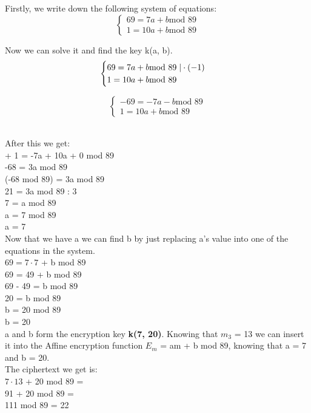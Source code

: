 \documentclass[12pt]{article}
\begin{document}
\noindent Firstly, we write down the following system of equations:
$$\begin{cases}
    69 = 7a + b \text{mod 89} \\
    1 = 10a + b \text{mod 89} 
\end{cases}$$

Now we can solve it and find the key k(a, b). 
$$\begin{cases}
    69 = 7a + b \text{mod 89} \hspace{0.1cm} | \cdot (-1) \\
    1 = 10a + b \text{mod 89} 
\end{cases}$$

$$\begin{cases}
    -69 = -7a - b \text{mod 89} \\
    1 = 10a + b \text{mod 89} 
\end{cases}$$

\noindent \\After this we get: \\

 + 1 = -7a + 10a + 0 mod 89 \\
-68 = 3a mod 89 \\
(-68 mod 89) = 3a mod 89 \\
21 = 3a mod 89 \textbar{} : 3\\
7 = a mod 89 \\
a = 7 mod 89 \\
a = 7 \\

\noindent Now that we have a we can find b by just replacing a's value into one of the equations in the system. \\

\noindent $69 = 7 \cdot 7$ + b mod 89 \\
69 = 49 + b mod 89 \\
69 - 49 = b mod 89 \\
20 = b mod 89 \\
b = 20 mod 89 \\
b = 20 \\

\noindent a and b form the encryption key \textbf{k(7, 20)}.
Knowing that $m_3$ = 13 we can insert it into the Affine encryption function
$E_m$ = am + b mod 89, knowing that a = 7 and b = 20. \\

\noindent The ciphertext we get is: \\

\noindent $7 \cdot 13$ + 20 mod 89 = \\
91 + 20 mod 89 = \\
111 mod 89 = 22 \\
\end{document}
